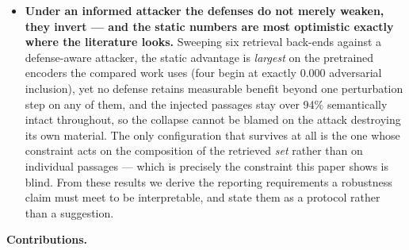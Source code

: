 \documentclass[authoryear,review,3p,times]{elsarticle}
\begin{document}
\begin{itemize}
\item
  \textbf{Under an informed attacker the defenses do not merely weaken, they invert --- and the static numbers are most optimistic exactly where the literature looks.} Sweeping six retrieval back-ends against a defense-aware attacker, the static advantage is \emph{largest} on the pretrained encoders the compared work uses (four begin at exactly 0.000 adversarial inclusion), yet no defense retains measurable benefit beyond one perturbation step on any of them, and the injected passages stay over 94\% semantically intact throughout, so the collapse cannot be blamed on the attack destroying its own material. The only configuration that survives at all is the one whose constraint acts on the composition of the retrieved \emph{set} rather than on individual passages --- which is precisely the constraint this paper shows is blind. From these results we derive the reporting requirements a robustness claim must meet to be interpretable, and state them as a protocol rather than a suggestion.
\end{itemize}

\textbf{Contributions.}
\end{document}
